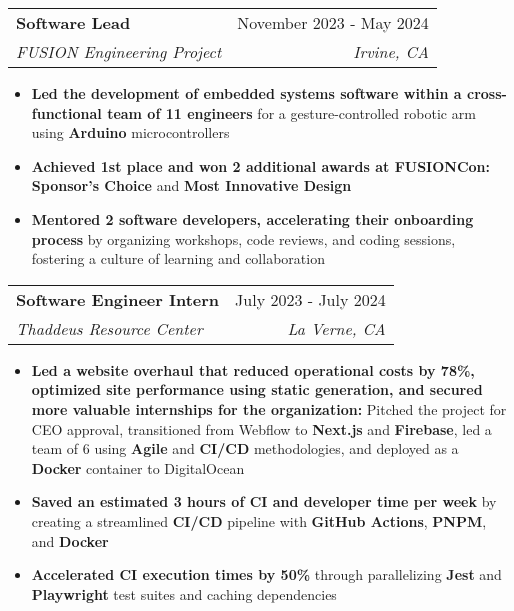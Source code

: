 \documentclass[letterpaper,11pt]{article}
\makeatletter
\newcommand{\resumeItem}[1]{
  \item\setstretch{.95}\small{
    {#1 \vspace{-2pt}}
  }
}
\newcommand{\resumeSubheading}[4]{
  \vspace{-2pt}\item
    \begin{tabular*}{0.97\textwidth}[t]{l@{\extracolsep{\fill}}r}
      \textbf{#1} & #2 \\
      \textit{\small#3} & \textit{\small #4} \\
    \end{tabular*}\vspace{-4.8pt}
}
\newcommand{\resumeItemListStart}{\begin{itemize}}
\newcommand{\resumeItemListEnd}{\end{itemize}\vspace{-5pt}}
\makeatother
\begin{document}
  \resumeSubheading
  {Software Lead}{November 2023 - May 2024}
  {FUSION Engineering Project}{Irvine, CA}
  \resumeItemListStart
    \resumeItem{\textbf{Led the development of embedded systems software within a cross-functional team of 11 engineers} for a gesture-controlled robotic arm using \textbf{Arduino} microcontrollers}
    \resumeItem{\textbf{Achieved 1st place and won 2 additional awards at FUSIONCon:} \textbf{Sponsor's Choice} and \textbf{Most Innovative Design}}
    \resumeItem{\textbf{Mentored 2 software developers, accelerating their onboarding process} by organizing workshops, code reviews, and coding sessions, fostering a culture of learning and collaboration}
  \resumeItemListEnd
  
  \resumeSubheading
    {Software Engineer Intern}{July 2023 - July 2024}
    {Thaddeus Resource Center}{La Verne, CA}
    \resumeItemListStart
      \resumeItem{\textbf{Led a website overhaul that reduced operational costs by 78\%, optimized site performance using static generation, and secured more valuable internships for the organization:} Pitched the project for CEO approval, transitioned from Webflow to \textbf{Next.js} and \textbf{Firebase}, led a team of 6 using \textbf{Agile} and \textbf{CI/CD} methodologies, and deployed as a \textbf{Docker} container to DigitalOcean}
      \resumeItem{\textbf{Saved an estimated 3 hours of CI and developer time per week} by creating a streamlined \textbf{CI/CD} pipeline with \textbf{GitHub Actions}, \textbf{PNPM}, and \textbf{Docker}} \
      \resumeItem{\textbf{Accelerated CI execution times by 50\%} through parallelizing \textbf{Jest} and \textbf{Playwright} test suites and caching dependencies}
    \resumeItemListEnd
\end{document}
